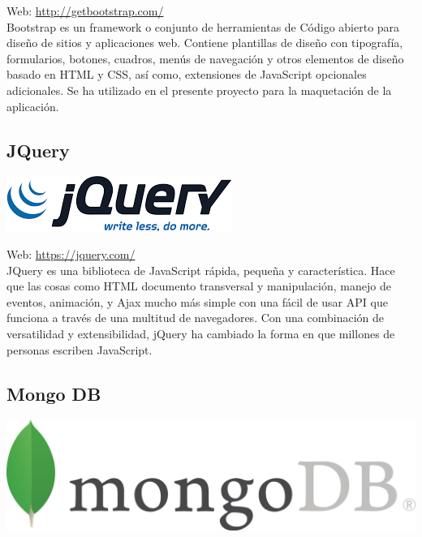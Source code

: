 Web: \url{http://getbootstrap.com/}\\

Bootstrap es un framework o conjunto de herramientas de Código abierto para diseño de sitios y aplicaciones web. Contiene plantillas de diseño con tipografía, formularios, botones, cuadros, menús de navegación y otros elementos de diseño basado en HTML y CSS, así como, extensiones de JavaScript opcionales adicionales. Se ha utilizado en el presente proyecto para la maquetación de la aplicación.

\subsection{JQuery}


\begin{center}
\includegraphics[scale=0.6]{imagenes/jquery-logo.png}
\end{center}

Web: \url{https://jquery.com/}\\

JQuery es una biblioteca de JavaScript rápida, pequeña y característica. Hace que las cosas como HTML documento transversal y manipulación, manejo de eventos, animación, y Ajax mucho más simple con una fácil de usar API que funciona a través de una multitud de navegadores. Con una combinación de versatilidad y extensibilidad, jQuery ha cambiado la forma en que millones de personas escriben JavaScript.\\


\subsection{Mongo DB}

\begin{center}
\includegraphics[scale=0.5]{imagenes/mongodb-logo.png}
\end{center}


